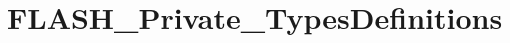 \hypertarget{group___f_l_a_s_h___private___types_definitions}{}\section{F\+L\+A\+S\+H\+\_\+\+Private\+\_\+\+Types\+Definitions}
\label{group___f_l_a_s_h___private___types_definitions}
